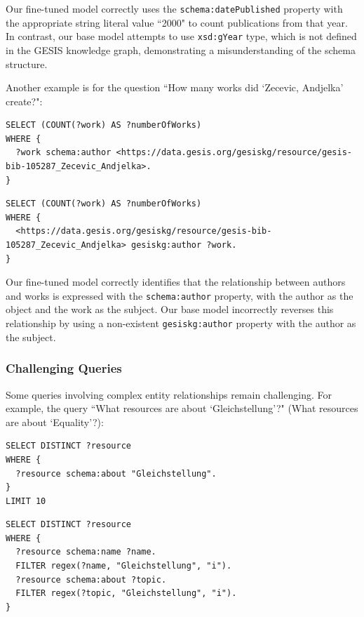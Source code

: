 Our fine-tuned model correctly uses the \texttt{schema:datePublished} property with the appropriate string literal value ``2000" to count publications from that year. In contrast, our base model attempts to use \texttt{xsd:gYear} type, which is not defined in the GESIS knowledge graph, demonstrating a misunderstanding of the schema structure.

Another example is for the question ``How many works did `Zecevic, Andjelka' create?":

\begin{lstlisting}[language=SPARQL, caption=Our Random-Walk Fine-tuned Model Output for Author Works, label=code:gesis-author-finetuned]
SELECT (COUNT(?work) AS ?numberOfWorks)
WHERE {
  ?work schema:author <https://data.gesis.org/gesiskg/resource/gesis-bib-105287_Zecevic_Andjelka>.
}
\end{lstlisting}

\begin{lstlisting}[language=SPARQL, caption=Our Base Model Output for Author Works, label=code:gesis-author-base]
SELECT (COUNT(?work) AS ?numberOfWorks)
WHERE {
  <https://data.gesis.org/gesiskg/resource/gesis-bib-105287_Zecevic_Andjelka> gesiskg:author ?work.
}
\end{lstlisting}

Our fine-tuned model correctly identifies that the relationship between authors and works is expressed with the \texttt{schema:author} property, with the author as the object and the work as the subject. Our base model incorrectly reverses this relationship by using a non-existent \texttt{gesiskg:author} property with the author as the subject.

\subsubsection{Challenging Queries}
Some queries involving complex entity relationships remain challenging. For example, the query ``What resources are about `Gleichstellung'?" (What resources are about `Equality'?):

\begin{lstlisting}[language=SPARQL, caption=Our Template Fine-tuned Model Output for Gleichstellung Resources, label=code:gesis-resources-template]
SELECT DISTINCT ?resource
WHERE {
  ?resource schema:about "Gleichstellung".
}
LIMIT 10
\end{lstlisting}

\begin{lstlisting}[language=SPARQL, caption=Our Random-Walk Fine-tuned Model Output for Gleichstellung Resources, label=code:gesis-resources-random]
SELECT DISTINCT ?resource
WHERE {
  ?resource schema:name ?name.
  FILTER regex(?name, "Gleichstellung", "i").
  ?resource schema:about ?topic.
  FILTER regex(?topic, "Gleichstellung", "i").
}
\end{lstlisting}


